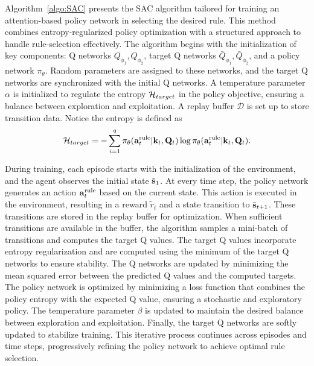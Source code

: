 Algorithm~\ref{algo:SAC} presents the SAC algorithm tailored for training an attention-based policy network in selecting the desired rule. This method combines entropy-regularized policy optimization with a structured approach to handle rule-selection effectively.
The algorithm begins with the initialization of key components: Q networks \( Q_{\phi_1}, Q_{\phi_2} \), target Q networks \( \bar{Q}_{\phi_1}, \bar{Q}_{\phi_2} \), and a policy network \( \pi_\theta \). Random parameters are assigned to these networks, and the target Q networks are synchronized with the initial Q networks. A temperature parameter \( \alpha \) is initialized to regulate the entropy ${\mathcal{H}}_{target}$ in the policy objective, ensuring a balance between exploration and exploitation. A replay buffer \( \mathcal{D} \) is set up to store transition data. Notice the entropy is defined as
\begin{align}
    \mathcal{H}_{target} = - \sum_{i=1}^q \pi_\theta({\mathbf{a}}^{\text{rule}}_t | {\mathbf{k}}_t, \mathbf{Q}_t) \log \pi_\theta({\mathbf{a}}^{\text{rule}}_t | \mathbf{k}_t, \mathbf{Q}_t).
\end{align}


During training, each episode starts with the initialization of the environment, and the agent observes the initial state \( \tilde{{\mathbf{s}}}_1 \). At every time step, the policy network generates an action \( {\mathbf{a}}^{\text{rule}}_t \) based on the current state. This action is executed in the environment, resulting in a reward \( \tilde{r}_t \) and a state transition to \( \tilde{{\mathbf{s}}}_{t+1} \). These transitions are stored in the replay buffer for optimization.
When sufficient transitions are available in the buffer, the algorithm samples a mini-batch of transitions and computes the target Q values. The target Q values incorporate entropy regularization and are computed using the minimum of the target Q networks to ensure stability. The Q networks are updated by minimizing the mean squared error between the predicted Q values and the computed targets.
The policy network is optimized by minimizing a loss function that combines the policy entropy with the expected Q value, ensuring a stochastic and exploratory policy. The temperature parameter $\beta$ is updated to maintain the desired balance between exploration and exploitation. Finally, the target Q networks are softly updated to stabilize training. This iterative process continues across episodes and time steps, progressively refining the policy network to achieve optimal rule selection.








